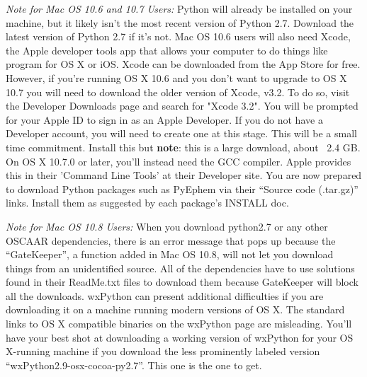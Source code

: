 \documentclass[a4paper]{article}
\begin{document}
\textit{Note for Mac OS 10.6 and 10.7 Users:} Python will already be installed on your machine, but it likely isn't the most recent version of Python 2.7. Download the latest version of Python 2.7 if it's not. Mac OS 10.6 users will also need Xcode, the Apple developer tools app that allows your computer to do things like program for OS X or iOS. Xcode can be downloaded from the App Store for free. However, if you're running OS X 10.6 and you don't want to upgrade to OS X 10.7 you will need to download the older version of Xcode, v3.2. To do so, visit the Developer Downloads page and search for "Xcode 3.2". You will be prompted for your Apple ID to sign in as an Apple Developer. If you do not have a Developer account, you will need to create one at this stage. This will be a small time commitment. Install this but \textbf{note}: this is a large download, about ~2.4 GB. On OS X 10.7.0 or later, you'll instead need the GCC compiler. Apple provides this in their 'Command Line Tools' at their Developer site. You are now prepared to download Python packages such as PyEphem via their ``Source code (.tar.gz)'' links. Install them as suggested by each package's INSTALL doc.

\textit{Note for Mac OS 10.8 Users:} When you download python2.7 or any other OSCAAR dependencies, there is an error message that pops up because the ``GateKeeper'', a function added in Mac OS 10.8, will not let you download things from an unidentified source. All of the dependencies have to use solutions found in their ReadMe.txt files to download them because GateKeeper will block all the downloads. wxPython can present additional difficulties if you are downloading it on a machine running modern versions of OS X. The standard links to OS X compatible binaries on the wxPython page are misleading. You'll have your best shot at downloading a working version of wxPython for your OS X-running machine if you download the less prominently labeled version ``wxPython2.9-osx-cocoa-py2.7''. This one is the one to get.
\end{document}
